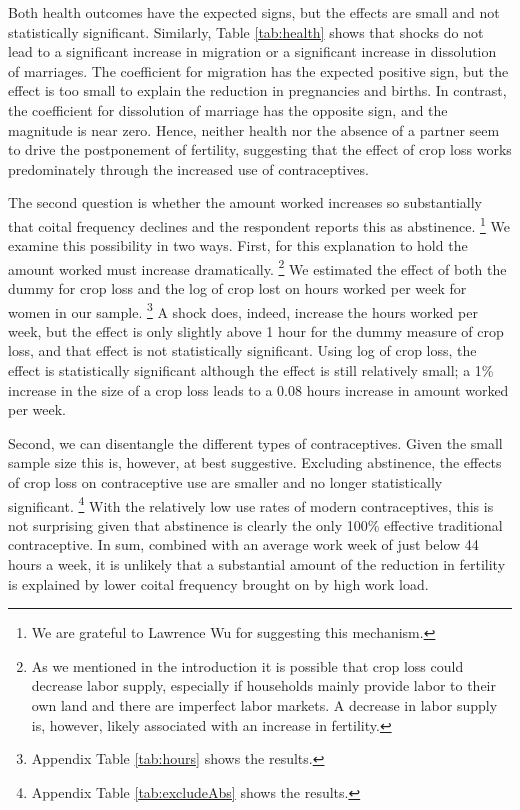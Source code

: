 \documentclass[letterpaper,12pt]{article}
\begin{document}




Both health outcomes have the expected signs, but the effects are small
and not statistically significant.
Similarly, Table \ref{tab:health} shows that shocks do not lead to a
significant increase in migration or a significant increase in dissolution of
marriages.
The coefficient for migration has the expected positive sign, but the
effect is too small to explain the reduction in pregnancies and births. 
In contrast, the coefficient for dissolution of marriage has the
opposite sign, and the magnitude is near zero. 
Hence, neither health nor the absence of a partner seem to drive the
postponement of fertility, suggesting that the effect of crop loss 
works predominately through the increased use of contraceptives.


The second question is whether the amount worked increases so substantially 
that coital frequency declines and the respondent reports this as abstinence.%
\footnote{
We are grateful to Lawrence Wu for suggesting this mechanism.
}
We examine this possibility in two ways.
First, for this explanation to hold the amount worked must increase 
dramatically.%
\footnote{
As we mentioned in the introduction it is possible that crop loss could
decrease labor supply, especially if households mainly provide labor
to their own land and there are imperfect labor markets.
A decrease in labor supply is, however, likely associated with an
increase in fertility.
}
We estimated the effect of both the dummy for crop loss and the log
of crop lost on hours worked per week for women in our sample.%
\footnote{
Appendix Table \ref{tab:hours} shows the results.
}
A shock does, indeed, increase the hours worked per week, but the 
effect is only slightly above 1 hour for the dummy measure of crop loss, 
and that effect is not statistically significant.
Using log of crop loss, the effect is statistically significant
although the effect is still relatively small; 
a 1\% increase in the size of a crop loss leads to a 0.08 hours
increase in amount worked per week.

Second, we can disentangle the different types of contraceptives.
Given the small sample size this is, however, at best suggestive.
Excluding abstinence, the effects of crop loss on contraceptive use
are smaller and no longer statistically significant.%
\footnote{
Appendix Table \ref{tab:excludeAbs} shows the results.
}
With the relatively low use rates of modern contraceptives, this
is not surprising given that abstinence is clearly the only 100\%
effective traditional contraceptive.
In sum, combined with an average work week of just below 44 hours a week,
it is unlikely that a substantial amount of the reduction in 
fertility is explained by lower coital frequency brought on by
high work load.
\end{document}
